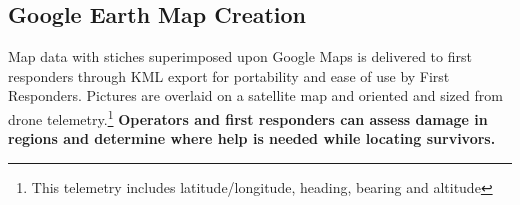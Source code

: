 
\subsection{Google Earth Map Creation}

Map data with stiches superimposed upon Google Maps is delivered to first responders through KML export for portability and ease of use by First Responders. Pictures are overlaid on a satellite map and oriented and sized from drone telemetry.\footnote{This telemetry includes latitude/longitude, heading, bearing and altitude} \textbf{Operators and first responders can assess damage in regions and determine where help is needed while locating survivors.}

